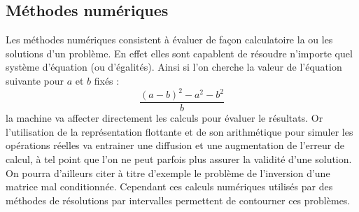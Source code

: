 \subsection{Méthodes numériques}
Les méthodes numériques consistent à évaluer de façon calculatoire la ou les solutions d'un problème. En effet elles sont capablent de résoudre n'importe quel système d'équation (ou d'égalités). Ainsi si l'on cherche la valeur de l'équation suivante pour $a$ et $b$ fixés : 
\begin{equation}\label{eq} \frac{{(a-b)}^{2}-a^2-b^2}{b}\end{equation}                                             
la machine va affecter directement les calculs pour évaluer le résultats. Or l'utilisation de la représentation flottante et de son arithmétique pour simuler les opérations réelles va entrainer une diffusion et une augmentation de l'erreur de calcul, à tel point que l'on ne peut  parfois plus assurer la validité d'une solution. On pourra d'ailleurs citer à titre d'exemple le problème de l'inversion d'une matrice mal conditionnée. Cependant ces calculs numériques utilisés  par des méthodes de résolutions par intervalles permettent de contourner ces problèmes.





